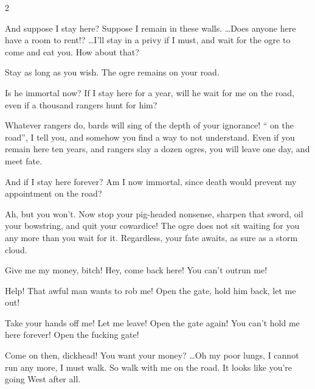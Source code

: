 \begin{multicols}{2}
\begin{speechtext}
  And suppose I stay here?
  Suppose I remain in these walls.
  \ldots Does anyone here have a room to rent!?
  \ldots I'll stay in a privy if I must, and wait for the \gls{ogre} to come and eat you.
  How about that?

  {\sffamily Stay as long as you wish.
  The \gls{ogre} remains on your road.}

  Is he immortal now?
  If I stay here for a year, will he wait for me on the road, even if a thousand rangers hunt for him?

  {\sffamily Whatever rangers do, bards will sing of the depth of your ignorance!
  `` on the road'', I tell you, and somehow you find a way to not understand.
  Even if you remain here ten years, and rangers slay a dozen \glspl{ogre}, you will leave one day, and meet fate.}

  And if I stay here forever?
  Am I now immortal, since death would prevent my appointment on the road?

  {\sffamily Ah, but you won't.
  Now stop your pig-headed nonsense, sharpen that sword, oil your bowstring, and quit your cowardice!
  The \gls{ogre} does not sit waiting for you any more than you wait for it.
  Regardless, your fate awaits, as sure as a storm cloud.}

  Give me my money, bitch!
  Hey, come back here!
  You can't outrun me!

  {\sffamily Help!
  That awful man wants to rob me!
  Open the gate, hold him back, let me out!}

  Take your hands off me!
  Let me leave!
  Open the gate again!
  You can't hold me here forever!
  Open the fucking gate!

  {\sffamily Come on then, dickhead!
  You want your money?
  \ldots Oh my poor lungs, I cannot run any more, I must walk.
  So walk with me on the road.
  It looks like you're going West after all.}

\end{speechtext}
\end{multicols}
